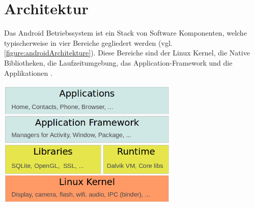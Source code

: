 \section{Architektur}
Das Android Betriebssystem ist ein Stack von Software Komponenten, welche typischerweise in vier Bereiche gegliedert werden (vgl. \ref{figure:androidArchitekture}). Diese Bereiche sind der Linux Kernel, die Native Bibliotheken, die Laufzeitumgebung, das Application-Framework und die Applikationen \cite{androidTutorialOS}. \\

\begin{minipage}{\textwidth} 
	\centering	
	\includegraphics[width=0.65\textwidth]{figures/android_stack.png}
	\label{figure:androidArchitekture}
	\vspace{2ex}
\end{minipage}

